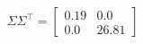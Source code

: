 \documentclass[preview]{standalone}
\begin{document}
\begin{align*}
\Sigma\Sigma^\top=\left[\begin{matrix}0.19&0.0\\0.0&26.81\end{matrix}\right]
\end{align*}
\end{document}
